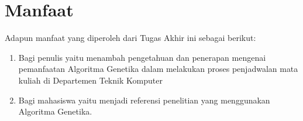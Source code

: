 \section{Manfaat}
\label{sec:manfaat}

Adapun manfaat yang diperoleh dari Tugas Akhir ini sebagai berikut:
\begin{enumerate}
    \item Bagi penulis yaitu menambah pengetahuan dan penerapan mengenai pemanfaatan Algoritma Genetika dalam melakukan proses penjadwalan mata kuliah di Departemen Teknik Komputer 
    \item Bagi mahasiswa yaitu menjadi referensi penelitian yang menggunakan Algoritma Genetika.
\end{enumerate}
